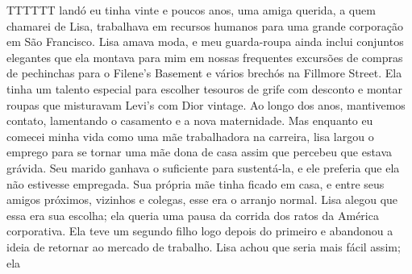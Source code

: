 TTTTTT landó eu tinha vinte e poucos anos, uma amiga querida, a quem chamarei de Lisa, trabalhava em recursos humanos para uma grande corporação em São Francisco. Lisa amava moda, e meu guarda-roupa ainda inclui conjuntos elegantes que ela montava para mim em nossas frequentes excursões de compras de pechinchas para o Filene's Basement e vários brechós na Fillmore Street. Ela tinha um talento especial para escolher tesouros de grife com desconto e montar roupas que misturavam Levi's com Dior vintage. Ao longo dos anos, mantivemos contato, lamentando o casamento e a nova maternidade. Mas enquanto eu comecei minha vida como uma mãe trabalhadora na carreira, lisa largou o emprego para se tornar uma mãe dona de casa assim que percebeu que estava grávida. Seu marido ganhava o suficiente para sustentá-la, e ele preferia que ela não estivesse empregada. Sua própria mãe tinha ficado em casa, e entre seus amigos próximos, vizinhos e colegas, esse era o arranjo normal. Lisa alegou que essa era sua escolha; ela queria uma pausa da corrida dos ratos da América corporativa. Ela teve um segundo filho logo depois do primeiro e abandonou a ideia de retornar ao mercado de trabalho. Lisa achou que seria mais fácil assim; ela
 \par 

